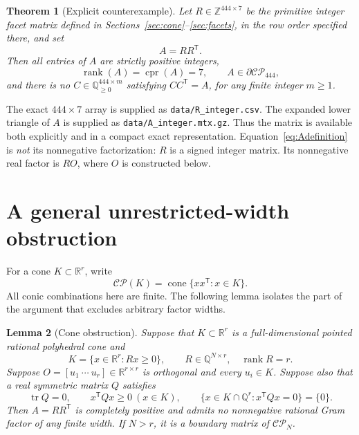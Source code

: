 \documentclass[11pt]{article}
\newtheorem{theorem}{Theorem}[section]
\newtheorem{lemma}[theorem]{Lemma}
\theoremstyle{definition}
\newcommand{\R}{\mathbb R}
\newcommand{\Q}{\mathbb Q}
\newcommand{\Z}{\mathbb Z}
\newcommand{\CP}{\mathcal{CP}}
\newcommand{\cone}{\operatorname{cone}}
\newcommand{\rank}{\operatorname{rank}}
\newcommand{\tr}{\operatorname{tr}}
\newcommand{\cpr}{\operatorname{cpr}}
\newcommand{\trans}{^{\mathsf T}}
\numberwithin{equation}{section}
\begin{document}
\begin{theorem}[Explicit counterexample]\label{thm:main}
Let $R\in\Z^{444\times7}$ be the primitive integer facet matrix defined in
Sections~\ref{sec:cone}--\ref{sec:facets}, in the row order specified there,
and set
\begin{equation}\label{eq:Adefinition}
 A=RR\trans.
\end{equation}
Then all entries of $A$ are strictly positive integers,
\[
 \rank(A)=\cpr(A)=7,\qquad A\in\partial\CP_{444},
\]
and there is no $C\in\Q_{\geq0}^{444\times m}$ satisfying $CC\trans=A$,
for any finite integer $m\geq1$.
\end{theorem}

The exact $444\times7$ array is supplied as \texttt{data/R\_integer.csv}.
The expanded lower triangle of $A$ is supplied as
\texttt{data/A\_integer.mtx.gz}. Thus the matrix is available both explicitly
and in a compact exact representation. Equation~\eqref{eq:Adefinition} is
\emph{not} its nonnegative factorization: $R$ is a signed integer matrix.
Its nonnegative real factor is $RO$, where $O$ is constructed below.

\section{A general unrestricted-width obstruction}\label{sec:obstruction}
For a cone $K\subset\R^r$, write
\[
 \CP(K)=\cone\{xx\trans:x\in K\}.
\]
All conic combinations here are finite. The following lemma isolates the
part of the argument that excludes arbitrary factor widths.

\begin{lemma}[Cone obstruction]\label{lem:obstruction}
Suppose that $K\subset\R^r$ is a full-dimensional pointed rational
polyhedral cone and
\[
 K=\{x\in\R^r:Rx\geq0\},\qquad R\in\Q^{N\times r},\quad \rank R=r.
\]
Suppose $O=[u_1\ \cdots\ u_r]\in\R^{r\times r}$ is orthogonal and every
$u_i\in K$. Suppose also that a real symmetric matrix $Q$ satisfies
\begin{equation}\label{eq:abstractconditions}
 \tr Q=0,\qquad x\trans Qx\geq0\ (x\in K),\qquad
 \{x\in K\cap\Q^r:x\trans Qx=0\}=\{0\}.
\end{equation}
Then $A=RR\trans$ is completely positive and admits no nonnegative rational
Gram factor of any finite width. If $N>r$, it is a boundary matrix of $\CP_N$.
\end{lemma}
\end{document}
